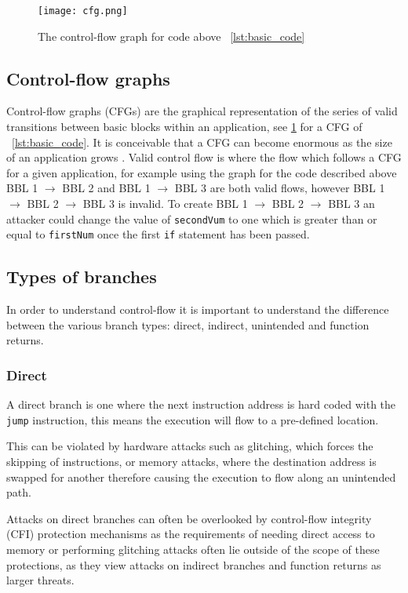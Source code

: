 \begin{figure}
  \texttt{[image: cfg.png]}
  \caption{The control-flow graph for code above ~\ref{lst:basic_code}}
  \label{fig:basicCFG}
\end{figure}

\subsection{Control-flow graphs}
Control-flow graphs (CFGs) are the graphical representation of the series of valid transitions between basic blocks within an application, see \ref{fig:basicCFG} for a CFG of ~\ref{lst:basic_code}. It is conceivable that a CFG can become enormous as the size of an application grows 
\ifnotesincluded
{}
\fi. Valid control flow is where the flow which follows a CFG for a given application, for example using the graph for the code described above BBL 1 $\rightarrow$ BBL 2 and BBL 1 $\rightarrow$ BBL 3 are both valid flows, however BBL 1 $\rightarrow$ BBL 2 $\rightarrow$ BBL 3 is invalid. To create BBL 1 $\rightarrow$ BBL 2 $\rightarrow$ BBL 3 an attacker could change the value of \verb|secondVum| to one which is greater than or equal to \verb|firstNum| once the first \verb|if| statement has been passed. 

\subsection{Types of branches}
In order to understand control-flow it is important to understand the difference between the various branch types: direct, indirect, unintended and function returns.

\subsubsection{Direct}
A direct branch is one where the next instruction address is hard coded with the \verb|jump| instruction, this means the execution will flow to a pre-defined location.

This can be violated by hardware attacks such as glitching, which forces the skipping of instructions, or memory attacks, where the destination address is swapped for another therefore causing the execution to flow along an unintended path.

Attacks on direct branches can often be overlooked by control-flow integrity (CFI) protection mechanisms as the requirements of needing direct access to memory or performing glitching attacks often lie outside of the scope of these protections, as they view attacks on indirect branches and function returns as larger threats.

